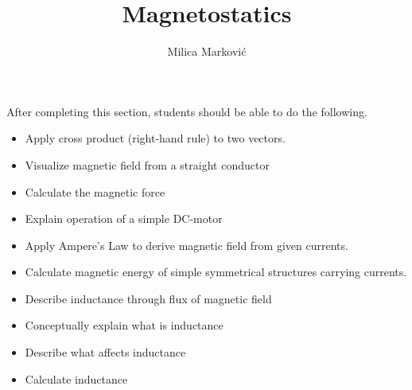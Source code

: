 \documentclass{ximera}
\title{Magnetostatics}
\author{Milica Markovi{\'c}}
\begin{document}
\begin{abstract}
\end{abstract}

\maketitle

\begin{sectionOutcomes}

After completing this section, students should be able to do the following.

\begin{itemize}
\item Apply cross product (right-hand rule) to two vectors.
\item Visualize magnetic field from a straight conductor
\item Calculate the magnetic force
\item Explain operation of a simple DC-motor
\item Apply Ampere's Law to derive magnetic field from given currents.
\item Calculate magnetic energy of simple symmetrical structures carrying currents.
\item Describe inductance through flux of magnetic field
\item Conceptually explain what is inductance
\item Describe what affects inductance
\item Calculate inductance 
\end{itemize}

\end{sectionOutcomes}
\end{document}
